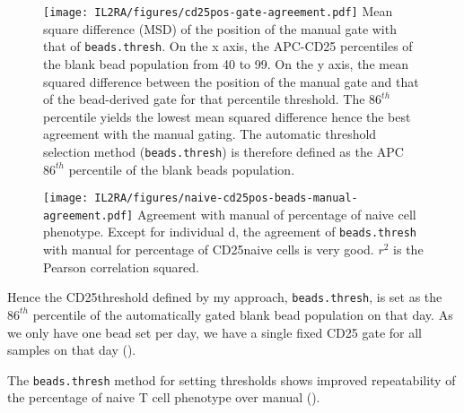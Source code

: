 \begin{figure}[h]
\centering
  \texttt{[image: IL2RA/figures/cd25pos-gate-agreement.pdf]}
{ Mean square difference (MSD) of the position of the manual gate with that of \texttt{beads.thresh}. }
{
On the x axis, the APC-CD25 percentiles of the blank bead population from 40 to 99.
On the y axis, the mean squared difference between the position of the manual gate and that of the bead-derived gate for that percentile threshold.
The $86^{th}$ percentile yields the lowest mean squared difference hence the best agreement with the manual gating.
The automatic threshold selection method (\texttt{beads.thresh}) is therefore defined as the APC $86^{th}$ percentile of the blank beads population.
}
\end{figure}

\begin{figure}[h]
\centering
\texttt{[image: IL2RA/figures/naive-cd25pos-beads-manual-agreement.pdf]}
{ Agreement with manual of percentage of \positive naive cell phenotype. }
{
  Except for individual d, the agreement of \texttt{beads.thresh} with manual for percentage of CD25\positive naive cells
  is very good.  $r^2$ is the Pearson correlation squared.
}
\end{figure}

Hence the CD25\positive threshold defined by my approach, \texttt{beads.thresh}, is set as the $86^{th}$ percentile of the automatically gated blank bead population on that day.
As we only have one bead set per day, we have a single fixed CD25 gate for all samples on that day ().

The \texttt{beads.thresh} method for setting  thresholds  shows improved repeatability of the percentage of \positive naive T cell phenotype
over manual ().  




